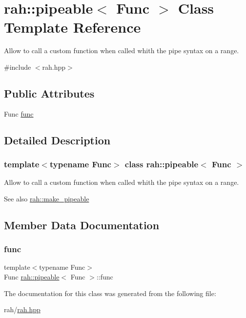 \hypertarget{structrah_1_1pipeable}{}\section{rah\+::pipeable$<$ Func $>$ Class Template Reference}
\label{structrah_1_1pipeable}


Allow to call a custom function when called whith the \textquotesingle{}pipe\textquotesingle{} syntax on a range.  




{\ttfamily \#include $<$rah.\+hpp$>$}

\subsection*{Public Attributes}
\begin{DoxyCompactItemize}
\item 
Func \mbox{\hyperlink{structrah_1_1pipeable_a2d26d18babf4edf2303bdb8b9a9dd165}{func}}
\end{DoxyCompactItemize}


\subsection{Detailed Description}
\subsubsection*{template$<$typename Func$>$\newline
class rah\+::pipeable$<$ Func $>$}

Allow to call a custom function when called whith the \textquotesingle{}pipe\textquotesingle{} syntax on a range. 

\begin{DoxySeeAlso}{See also}
\mbox{\hyperlink{namespacerah_a274b78c4c0af5dd58ce280f02223fb55}{rah\+::make\+\_\+pipeable}} 
\end{DoxySeeAlso}


\subsection{Member Data Documentation}
\mbox{\label{structrah_1_1pipeable_a2d26d18babf4edf2303bdb8b9a9dd165}} 
\subsubsection{\texorpdfstring{func}{func}}
{\footnotesize\ttfamily template$<$typename Func$>$ \\
Func \mbox{\hyperlink{structrah_1_1pipeable}{rah\+::pipeable}}$<$ Func $>$\+::func}



The documentation for this class was generated from the following file\+:\begin{DoxyCompactItemize}
\item 
rah/\mbox{\hyperlink{rah_8hpp}{rah.\+hpp}}\end{DoxyCompactItemize}
